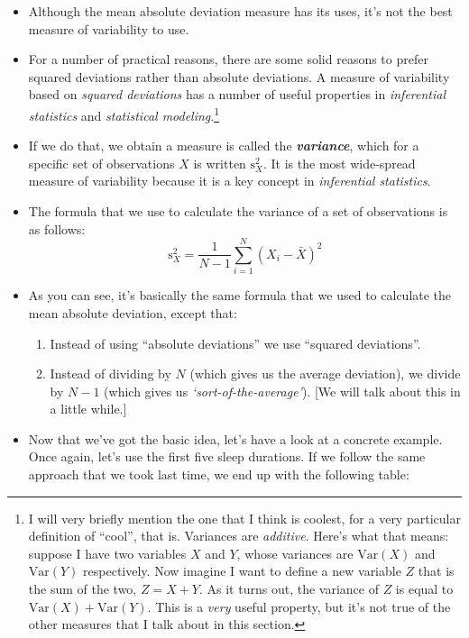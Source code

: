 \documentclass[
]{book}
\providecommand{\tightlist}{%
  \setlength{\itemsep}{0pt}\setlength{\parskip}{0pt}}
\begin{document}
\begin{itemize}
\item
  Although the mean absolute deviation measure has its uses, it's not the best measure of variability to use.
\item
  For a number of practical reasons, there are some solid reasons to prefer squared deviations rather than absolute deviations. A measure of variability based on \emph{squared deviations} has a number of useful properties in \emph{inferential statistics} and \emph{statistical modeling}.\footnote{I will very briefly mention the one that I think is coolest, for a very particular definition of ``cool'', that is. Variances are \emph{additive}. Here's what that means: suppose I have two variables \(X\) and \(Y\), whose variances are \(\mbox{Var}(X)\) and \(\mbox{Var}(Y)\) respectively. Now imagine I want to define a new variable \(Z\) that is the sum of the two, \(Z = X+Y\). As it turns out, the variance of \(Z\) is equal to \(\mbox{Var}(X) + \mbox{Var}(Y)\). This is a \emph{very} useful property, but it's not true of the other measures that I talk about in this section.}
\item
  If we do that, we obtain a measure is called the \textbf{\emph{variance}}, which for a specific set of observations \(X\) is written \(\mbox{s}_X^2\). It is the most wide-spread measure of variability because it is a key concept in \emph{inferential statistics}.
\item
  The formula that we use to calculate the variance of a set of observations is as follows:
  \[
  \mbox{s}_X^2 = \frac{1}{N-1} \sum_{i=1}^N \left( X_i - \bar{X} \right)^2
  \]
\item
  As you can see, it's basically the same formula that we used to calculate the mean absolute deviation, except that:

  \begin{enumerate}
  \def\labelenumi{\arabic{enumi}.}
  \tightlist
  \item
    Instead of using ``absolute deviations'' we use ``squared deviations''.
  \item
    Instead of dividing by \(N\) (which gives us the average deviation), we divide by \(N-1\) (which gives us \emph{`sort-of-the-average'}). {[}We will talk about this in a little while.{]}
  \end{enumerate}
\end{itemize}

\begin{itemize}
\tightlist
\item
  Now that we've got the basic idea, let's have a look at a concrete example. Once again, let's use the first five sleep durations. If we follow the same approach that we took last time, we end up with the following table:
\end{itemize}
\end{document}
